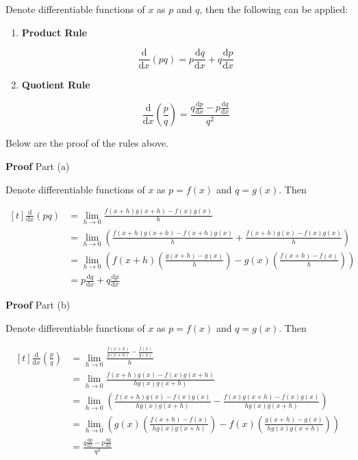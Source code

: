 \documentclass[a4paper,12pt]{article}
\newcommand{\n}{\vspace{3mm}}
\newcommand{\diff}{\mathrm{d}}
\newenvironment{block}[4][Block]{ %
\begin{list}{}{
  \setlength{\leftmargin}{0mm}
  \setlength{\rightmargin}{0mm}
  \setlength{\topsep}{0mm}
  \setlength{\partopsep}{0mm}
  \parsep\parskip
  \setlength{\itemsep}{-\parsep}
  }
  \needspace{\baselineskip}
  \item \textbf{#2 #3} \hspace{1mm} #4
  \vspace{1mm}
  \item
  }
{
\end{list}
}
\newenvironment{alist}{ %
\begin{enumerate}[label=(\alph*)]
}{
\end{enumerate}
}
\begin{document}
Denote differentiable functions of $x$ as $p$ and $q$, then the following can be applied:

\begin{alist}
  \item \textbf{Product Rule}

  $$\frac{\diff }{\diff  x}(pq)=p\frac{\diff  q}{\diff  x}+q\frac{\diff  p}{\diff  x}$$

  \item \textbf{Quotient Rule}

  $$\frac{\diff }{\diff  x}(\frac{p}{q})=\frac{q\frac{\diff  p}{\diff  x}-p\frac{\diff  q}{\diff  x}}{q^{2}}$$
\end{alist}

Below are the proof of the rules above.\n

\begin{block}{Proof}{}{Part (a)}
  Denote differentiable functions of $x$ as $p=f(x)$ and $q=g(x)$. Then

  $$\begin{aligned}[t]
    \frac{\diff }{\diff  x}(pq)&=\lim_{h\to 0}\frac{f(x+h)g(x+h)-f(x)g(x)}{h}\\
    &=\lim_{h\to 0}(\frac{f(x+h)g(x+h)-f(x+h)g(x)}{h}+\frac{f(x+h)g(x)-f(x)g(x)}{h})\\
    &=\lim_{h\to 0}(f(x+h)(\frac{g(x+h)-g(x)}{h})-g(x)(\frac{f(x+h)-f(x)}{h}))\\
    &=p\frac{\diff  q}{\diff  x}+q\frac{\diff  p}{\diff  x}
  \end{aligned}$$
\end{block}\n

\begin{block}{Proof}{}{Part (b)}
  Denote differentiable functions of $x$ as $p=f(x)$ and $q=g(x)$. Then

  $$\begin{aligned}[t]
    \frac{\diff }{\diff  x}(\frac{p}{q})&=\lim_{h\to 0}\frac{\frac{f(x+h)}{g(x+h)}-\frac{f(x)}{g(x)}}{h}\\
    &=\lim_{h\to 0}\frac{f(x+h)g(x)-f(x)g(x+h)}{hg(x)g(x+h)}\\
    &=\lim_{h\to 0}(\frac{f(x+h)g(x)-f(x)g(x)}{hg(x)g(x+h)}-\frac{f(x)g(x+h)-f(x)g(x)}{hg(x)g(x+h)})\\
    &=\lim_{h\to 0}(g(x)(\frac{f(x+h)-f(x)}{hg(x)g(x+h)})-f(x)(\frac{g(x+h)-g(x)}{hg(x)g(x+h)}))\\
    &=\frac{q\frac{\diff  p}{\diff  x}-p\frac{\diff  q}{\diff  x}}{q^{2}}
  \end{aligned}$$
\end{block}
\end{document}
